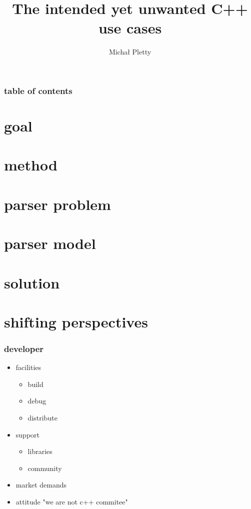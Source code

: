 \documentclass{beamer}
\title{The intended yet unwanted C++ use cases}
\author{Michał Pletty}
\begin{document}
\frame{\titlepage}

\begin{frame}
    \frametitle{table of contents}
    \tableofcontents
\end{frame}

\section{goal}



\section{method}



\section{parser problem}



\section{parser model}



\section{solution}



\section{shifting perspectives}

\begin{frame}
    \frametitle{developer}
    \begin{itemize}
        \item facilities
        \begin{itemize}
            \item build
            \item debug
            \item distribute
        \end{itemize}
        \item support
        \begin{itemize}
            \item libraries
            \item community
        \end{itemize}
        \item market demands
        \item attitude "we are not c++ commitee"
    \end{itemize}
\end{frame}
\end{document}
